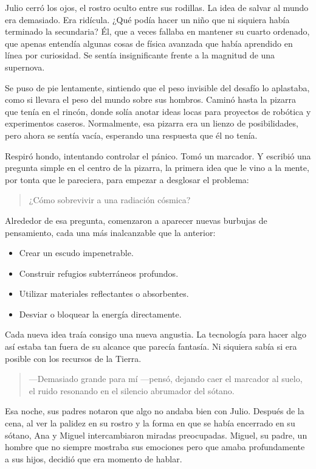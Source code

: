 \documentclass[a4paper,12pt]{book}
\begin{document}
Julio cerró los ojos, el rostro oculto entre sus rodillas. La idea de salvar al mundo era demasiado. Era ridícula. ¿Qué podía hacer un niño que ni siquiera había terminado la secundaria? Él, que a veces fallaba en mantener su cuarto ordenado, que apenas entendía algunas cosas de física avanzada que había aprendido en línea por curiosidad. Se sentía insignificante frente a la magnitud de una supernova.

Se puso de pie lentamente, sintiendo que el peso invisible del desafío lo aplastaba, como si llevara el peso del mundo sobre sus hombros. Caminó hasta la pizarra que tenía en el rincón, donde solía anotar ideas locas para proyectos de robótica y experimentos caseros. Normalmente, esa pizarra era un lienzo de posibilidades, pero ahora se sentía vacía, esperando una respuesta que él no tenía.

Respiró hondo, intentando controlar el pánico. Tomó un marcador. Y escribió una pregunta simple en el centro de la pizarra, la primera idea que le vino a la mente, por tonta que le pareciera, para empezar a desglosar el problema:

\begin{quote}
    ¿Cómo sobrevivir a una radiación cósmica?
\end{quote}

Alrededor de esa pregunta, comenzaron a aparecer nuevas burbujas de pensamiento, cada una más inalcanzable que la anterior:

\begin{itemize}
    \item Crear un escudo impenetrable.
    \item Construir refugios subterráneos profundos.
    \item Utilizar materiales reflectantes o absorbentes.
    \item Desviar o bloquear la energía directamente.
\end{itemize}

Cada nueva idea traía consigo una nueva angustia. La tecnología para hacer algo así estaba tan fuera de su alcance que parecía fantasía. Ni siquiera sabía si era posible con los recursos de la Tierra.

\begin{quote}
    —Demasiado grande para mí —pensó, dejando caer el marcador al suelo, el ruido resonando en el silencio abrumador del sótano.
\end{quote}

Esa noche, sus padres notaron que algo no andaba bien con Julio. Después de la cena, al ver la palidez en su rostro y la forma en que se había encerrado en su sótano, Ana y Miguel intercambiaron miradas preocupadas. Miguel, su padre, un hombre que no siempre mostraba sus emociones pero que amaba profundamente a sus hijos, decidió que era momento de hablar.
\end{document}
